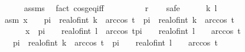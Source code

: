 \begin{isabellebody}
\ \ \ \ \isamarkupfalse%
\ assms\ \isamarkupfalse%
\ {\isacharparenleft}{\kern0pt}fact\ cos{\isacharunderscore}{\kern0pt}geq{\isacharunderscore}{\kern0pt}iff{\isacharparenright}{\kern0pt}\isanewline
\ \ \isamarkupfalse%
\ \isamarkupfalse%
\ {\isachardoublequoteopen}{\isasymdots}\ {\isacharequal}{\kern0pt}\ {\isacharparenleft}{\kern0pt}{\isasymnot}\ {\isacharparenleft}{\kern0pt}\ {\isacharquery}{\kern0pt}r{\isacharparenright}{\kern0pt}{\isacharparenright}{\kern0pt}{\isachardoublequoteclose}\isanewline
\ \ \isamarkupfalse%
\ {\isacharparenleft}{\kern0pt}safe{\isacharparenright}{\kern0pt}\isanewline
\ \ \ \ \isamarkupfalse%
\ k\ l\ \isamarkupfalse%
\ asm{\isacharcolon}{\kern0pt}\ {\isachardoublequoteopen}x\ {\isasymin}\ {\isacharbraceleft}{\kern0pt}{}\ {\isacharasterisk}{\kern0pt}\ pi\ {\isacharasterisk}{\kern0pt}\ real{\isacharunderscore}{\kern0pt}of{\isacharunderscore}{\kern0pt}int\ k\ {\isacharminus}{\kern0pt}\ arccos\ t{\isachardot}{\kern0pt}{\isachardot}{\kern0pt}{}\ {\isacharasterisk}{\kern0pt}\ pi\ {\isacharasterisk}{\kern0pt}\ real{\isacharunderscore}{\kern0pt}of{\isacharunderscore}{\kern0pt}int\ k\ {\isacharplus}{\kern0pt}\ arccos\ t{\isacharbraceright}{\kern0pt}{\isachardoublequoteclose}\isanewline
\ \ \ \ \ \ {\isachardoublequoteopen}x\ {\isasymin}\ {\isacharbraceleft}{\kern0pt}pi\ {\isacharasterisk}{\kern0pt}\ {\isacharparenleft}{\kern0pt}{}\ {\isacharasterisk}{\kern0pt}\ real{\isacharunderscore}{\kern0pt}of{\isacharunderscore}{\kern0pt}int\ l{\isacharparenright}{\kern0pt}\ {\isacharplus}{\kern0pt}\ arccos\ t{\isacharless}{\kern0pt}{\isachardot}{\kern0pt}{\isachardot}{\kern0pt}{\isacharless}{\kern0pt}pi\ {\isacharasterisk}{\kern0pt}\ {\isacharparenleft}{\kern0pt}{}\ {\isacharasterisk}{\kern0pt}\ {\isacharparenleft}{\kern0pt}real{\isacharunderscore}{\kern0pt}of{\isacharunderscore}{\kern0pt}int\ l\ {\isacharplus}{\kern0pt}\ {}{\isacharparenright}{\kern0pt}{\isacharparenright}{\kern0pt}\ {\isacharminus}{\kern0pt}\ arccos\ t{\isacharbraceright}{\kern0pt}{\isachardoublequoteclose}\isanewline
\ \ \ \ \isamarkupfalse%
\ {\isachardoublequoteopen}{}\ {\isacharasterisk}{\kern0pt}\ pi\ {\isacharasterisk}{\kern0pt}\ real{\isacharunderscore}{\kern0pt}of{\isacharunderscore}{\kern0pt}int\ k\ {\isacharminus}{\kern0pt}\ arccos\ t\ {\isacharless}{\kern0pt}\ pi\ {\isacharasterisk}{\kern0pt}\ {\isacharparenleft}{\kern0pt}{}\ {\isacharasterisk}{\kern0pt}\ {\isacharparenleft}{\kern0pt}real{\isacharunderscore}{\kern0pt}of{\isacharunderscore}{\kern0pt}int\ l\ {\isacharplus}{\kern0pt}\ {}{\isacharparenright}{\kern0pt}{\isacharparenright}{\kern0pt}\ {\isacharminus}{\kern0pt}\ arccos\ t{\isachardoublequoteclose}\ \isamarkupfalse%

\end{isabellebody}

